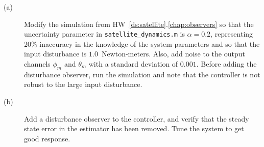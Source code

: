 \begin{description}
\item[(a)] Modify the simulation from HW~\ref{ds:satellite}.\ref{chap:observers} so that the uncertainty parameter in {\tt  satellite\_dynamics.m} is $\alpha=0.2$, representing 20\% inaccuracy in the knowledge of the system parameters and so that the input disturbance is $1.0$~Newton-meters. Also, add noise to the output channels $\phi_m$ and $\theta_m$ with a standard deviation of $0.001$.  Before adding the disturbance observer, run the simulation and note that the controller is not robust to the large input disturbance.
\item[(b)] Add a disturbance observer to the controller, and verify that the steady state error in the estimator has been removed.  Tune the system to get good response.
\end{description}

